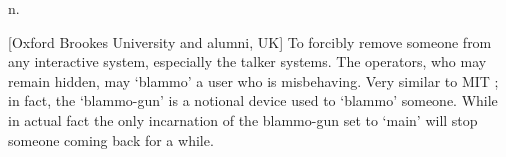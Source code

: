  n.

[Oxford Brookes University and alumni, UK] To forcibly remove someone from any
interactive system, especially the talker systems. The operators, who may remain
hidden, may `blammo' a user who is misbehaving. Very similar to MIT
; in fact, the `blammo-gun' is a notional device used to `blammo'
someone. While in actual fact the only incarnation of the blammo-gun set to
`main' will stop someone coming back for a while.

